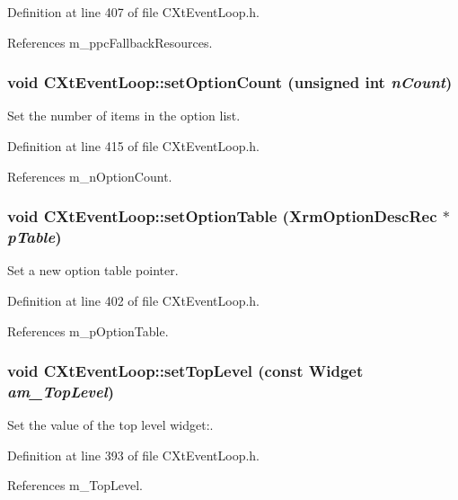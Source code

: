 Definition at line 407 of file CXt\-Event\-Loop.h.

References m\_\-ppc\-Fallback\-Resources.
\subsubsection{\setlength{\rightskip}{0pt plus 5cm}void CXt\-Event\-Loop::set\-Option\-Count (unsigned int {\em n\-Count})\hspace{0.3cm}{\tt  [inline, protected]}}\label{classCXtEventLoop_b5}


Set the number of items in the option list.



Definition at line 415 of file CXt\-Event\-Loop.h.

References m\_\-n\-Option\-Count.
\subsubsection{\setlength{\rightskip}{0pt plus 5cm}void CXt\-Event\-Loop::set\-Option\-Table (Xrm\-Option\-Desc\-Rec $\ast$ {\em p\-Table})\hspace{0.3cm}{\tt  [inline, protected]}}\label{classCXtEventLoop_b2}


Set a new option table pointer.



Definition at line 402 of file CXt\-Event\-Loop.h.

References m\_\-p\-Option\-Table.
\subsubsection{\setlength{\rightskip}{0pt plus 5cm}void CXt\-Event\-Loop::set\-Top\-Level (const Widget {\em am\_\-Top\-Level})\hspace{0.3cm}{\tt  [inline, protected]}}\label{classCXtEventLoop_b0}


Set the value of the top level widget:.



Definition at line 393 of file CXt\-Event\-Loop.h.

References m\_\-Top\-Level.
